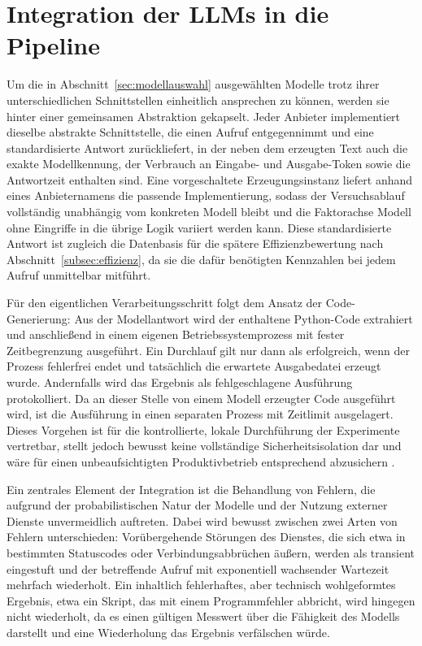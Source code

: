 \section{Integration der LLMs in die Pipeline}
\label{sec:llm-integration}

Um die in Abschnitt~\ref{sec:modellauswahl} ausgewählten Modelle trotz ihrer unterschiedlichen Schnittstellen einheitlich ansprechen zu können, werden sie hinter einer gemeinsamen Abstraktion gekapselt. Jeder Anbieter implementiert dieselbe abstrakte Schnittstelle, die einen Aufruf entgegennimmt und eine standardisierte Antwort zurückliefert, in der neben dem erzeugten Text auch die exakte Modellkennung, der Verbrauch an Eingabe- und Ausgabe-Token sowie die Antwortzeit enthalten sind. Eine vorgeschaltete Erzeugungsinstanz liefert anhand eines Anbieternamens die passende Implementierung, sodass der Versuchsablauf vollständig unabhängig vom konkreten Modell bleibt und die Faktorachse Modell ohne Eingriffe in die übrige Logik variiert werden kann. Diese standardisierte Antwort ist zugleich die Datenbasis für die spätere Effizienzbewertung nach Abschnitt~\ref{subsec:effizienz}, da sie die dafür benötigten Kennzahlen bei jedem Aufruf unmittelbar mitführt.

Für den eigentlichen Verarbeitungsschritt folgt dem Ansatz der Code-Generierung: Aus der Modellantwort wird der enthaltene Python-Code extrahiert und anschließend in einem eigenen Betriebssystemprozess mit fester Zeitbegrenzung ausgeführt. Ein Durchlauf gilt nur dann als erfolgreich, wenn der Prozess fehlerfrei endet und tatsächlich die erwartete Ausgabedatei erzeugt wurde. Andernfalls wird das Ergebnis als fehlgeschlagene Ausführung protokolliert. Da an dieser Stelle von einem Modell erzeugter Code ausgeführt wird, ist die Ausführung in einen separaten Prozess mit Zeitlimit ausgelagert. Dieses Vorgehen ist für die kontrollierte, lokale Durchführung der Experimente vertretbar, stellt jedoch bewusst keine vollständige Sicherheitsisolation dar und wäre für einen unbeaufsichtigten Produktivbetrieb entsprechend abzusichern \autocite{hassaniRoleChatGPTData2023,khanCognitiveETLUsing2025}.

Ein zentrales Element der Integration ist die Behandlung von Fehlern, die aufgrund der probabilistischen Natur der Modelle und der Nutzung externer Dienste unvermeidlich auftreten. Dabei wird bewusst zwischen zwei Arten von Fehlern unterschieden: Vorübergehende Störungen des Dienstes, die sich etwa in bestimmten Statuscodes oder Verbindungsabbrüchen äußern, werden als transient eingestuft und der betreffende Aufruf mit exponentiell wachsender Wartezeit mehrfach wiederholt. Ein inhaltlich fehlerhaftes, aber technisch wohlgeformtes Ergebnis, etwa ein Skript, das mit einem Programmfehler abbricht, wird hingegen nicht wiederholt, da es einen gültigen Messwert über die Fähigkeit des Modells darstellt und eine Wiederholung das Ergebnis verfälschen würde.

